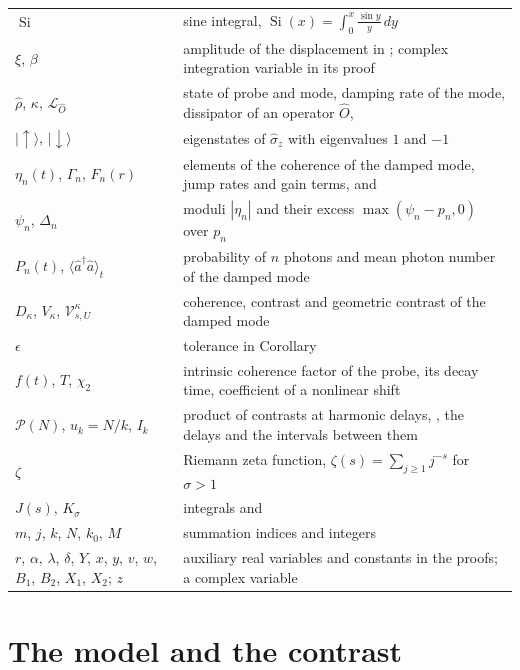 \documentclass[11pt,reqno]{amsart}
\makeatletter
\providecommand{\ket}[1]{|#1\rangle}
\let\CG@origref\ref
\let\CG@origeqref\eqref
\newcommand{\CG@gettip}[1]{\@ifundefined{CGTip@#1}{Reference: #1}{\csname CGTip@#1\endcsname}}
\DeclareRobustCommand{\CGref}[1]{\pdftooltip{\CG@origref{#1}}{\CG@gettip{#1}}}
\DeclareRobustCommand{\CGeqref}[1]{\pdftooltip{\CG@origeqref{#1}}{\CG@gettip{#1}}}
\numberwithin{equation}{section}
\theoremstyle{plain}
\theoremstyle{definition}
\theoremstyle{remark}
\makeatother
\begin{document}
\begin{table}[!htb]
\begin{tabular}{p{}p{}}
$\operatorname{Si}$ & sine integral, $\operatorname{Si}(x)=\int_0^x\frac{\sin y}y\,dy$\\
$\xi$, $\beta$ & amplitude of the displacement in \CGeqref{eq:dt}; complex integration variable in its proof\\
$\hat\rho$, $\kappa$, $\mathcal L_{\hat O}$ & state of probe and mode, damping rate of the mode, dissipator of an operator $\hat O$, \CGeqref{eq:master}\\
$\ket\uparrow$, $\ket\downarrow$ & eigenstates of $\hat\sigma_z$ with eigenvalues $1$ and $-1$\\
$\eta_n(t)$, $\Gamma_n$, $F_n(r)$ & elements of the coherence of the damped mode, jump rates and gain terms, \CGeqref{eq:rate} and \CGeqref{eq:duhamel}\\
$\psi_n$, $\Delta_n$ & moduli $|\eta_n|$ and their excess $\max(\psi_n-p_n,0)$ over $p_n$\\
$P_n(t)$, $\langle\hat a^\dagger\hat a\rangle_t$ & probability of $n$ photons and mean photon number of the damped mode\\
$D_\kappa$, $V_\kappa$, $\mathcal V^\kappa_{s,U}$ & coherence, contrast and geometric contrast of the damped mode\\
$\epsilon$ & tolerance in Corollary~\CGref{cor:damp}\\
$f(t)$, $T$, $\chi_2$ & intrinsic coherence factor of the probe, its decay time, coefficient of a nonlinear shift\\
$\mathcal P(N)$, $u_k=N/k$, $I_k$ & product of contrasts at harmonic delays, \CGeqref{eq:PN}, the delays and the intervals between them\\
$\zeta$ & Riemann zeta function, $\zeta(s)=\sum_{j\ge1}j^{-s}$ for $\sigma>1$\\
$J(s)$, $K_\sigma$ & integrals \CGeqref{eq:J} and \CGeqref{eq:Ksigma}\\
$m$, $j$, $k$, $N$, $k_0$, $M$ & summation indices and integers\\
$r$, $\alpha$, $\lambda$, $\delta$, $Y$, $x$, $y$, $v$, $w$, $B_1$, $B_2$, $X_1$, $X_2$; $z$ & auxiliary real variables and constants in the proofs; a complex variable\\
\bottomrule
\end{tabular}
\end{table}

\section{The model and the contrast}\label{sec:model}
\end{document}
